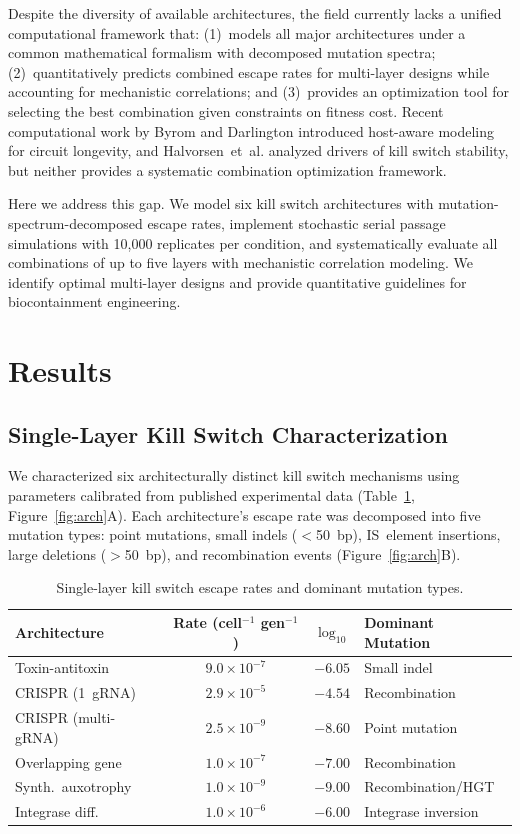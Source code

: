 \documentclass[journal=asbcd6,manuscript=article]{achemso}
\begin{document}
Despite the diversity of available architectures, the field currently lacks a unified computational framework that: (1)~models all major architectures under a common mathematical formalism with decomposed mutation spectra; (2)~quantitatively predicts combined escape rates for multi-layer designs while accounting for mechanistic correlations; and (3)~provides an optimization tool for selecting the best combination given constraints on fitness cost. Recent computational work by Byrom and Darlington\cite{Byrom2025} introduced host-aware modeling for circuit longevity, and Halvorsen~et~al.\cite{Halvorsen2022} analyzed drivers of kill switch stability, but neither provides a systematic combination optimization framework.

Here we address this gap. We model six kill switch architectures with mutation-spectrum-decomposed escape rates, implement stochastic serial passage simulations with 10,000 replicates per condition, and systematically evaluate all combinations of up to five layers with mechanistic correlation modeling. We identify optimal multi-layer designs and provide quantitative guidelines for biocontainment engineering.

\section{Results}

\subsection{Single-Layer Kill Switch Characterization}

We characterized six architecturally distinct kill switch mechanisms using parameters calibrated from published experimental data (Table~\ref{tab:single}, Figure~\ref{fig:arch}A). Each architecture's escape rate was decomposed into five mutation types: point mutations, small indels ($<$50~bp), IS~element insertions, large deletions ($>$50~bp), and recombination events (Figure~\ref{fig:arch}B).

\begin{table}[h]
\caption{Single-layer kill switch escape rates and dominant mutation types.}
\label{tab:single}
\centering
\begin{tabular}{lccl}
\toprule
Architecture & Rate (cell$^{-1}$ gen$^{-1}$) & $\log_{10}$ & Dominant Mutation \\
\midrule
Toxin-antitoxin & $9.0 \times 10^{-7}$ & $-6.05$ & Small indel \\
CRISPR (1~gRNA) & $2.9 \times 10^{-5}$ & $-4.54$ & Recombination \\
CRISPR (multi-gRNA) & $2.5 \times 10^{-9}$ & $-8.60$ & Point mutation \\
Overlapping gene & $1.0 \times 10^{-7}$ & $-7.00$ & Recombination \\
Synth.\ auxotrophy & $1.0 \times 10^{-9}$ & $-9.00$ & Recombination/HGT \\
Integrase diff. & $1.0 \times 10^{-6}$ & $-6.00$ & Integrase inversion \\
\bottomrule
\end{tabular}
\end{table}
\end{document}
